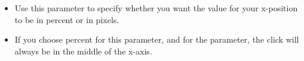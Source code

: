 %
\begin{itemize}
\item Use this parameter to specify whether you want the value for your x-position to be in percent or in pixels.
\item  If you choose percent for  this parameter, and  for the  parameter, the click will always be in the middle of the x-axis.
\end{itemize}
